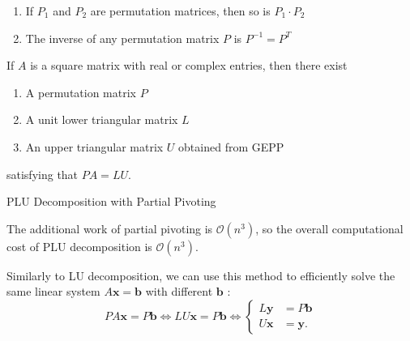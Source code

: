 \begin{lem}
	\hfill
	\begin{enumerate}
		\item If $P_1$ and $P_2$ are permutation matrices, then so is $P_1 \cdot P_2$
		\item The inverse of any permutation matrix $P$ is $P^{-1} = P^T$
	\end{enumerate}
\end{lem}

\begin{defn}
	\sloppy If $A$ is a square matrix with real or complex entries, then there exist
	\begin{enumerate}
		\item A permutation matrix $P$
		\item A unit lower triangular matrix $L$
		\item An upper triangular matrix $U$ obtained from GEPP
	\end{enumerate} 
	satisfying that $PA = LU$.
\end{defn}

\begin{algorithm}
	  \caption{PLU Decomposition with Partial Pivoting}\label{PLUDecomposition}
\end{algorithm}

\begin{rmk}
	The additional work of partial pivoting is $\mathcal{O}(n^3)$, so the overall computational cost of PLU decomposition is $\mathcal{O}(n^3)$.
\end{rmk}

\NewLine 

\noindent Similarly to LU decomposition, we can use this method to efficiently solve the same linear system $A \mathbf{x}=\mathbf{b}$ with different $\mathbf{b}$ :
$$
P A \mathbf{x}=P \mathbf{b} \Leftrightarrow L U \mathbf{x}=P \mathbf{b} \Leftrightarrow \begin{cases}L \mathbf{y} & =P \mathbf{b} \\ U \mathbf{x} & =\mathbf{y} .\end{cases}
$$

